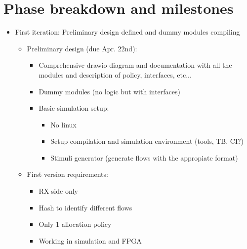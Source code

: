 \section{Phase breakdown and milestones}

\begin{itemize}
    \item First iteration: Preliminary design defined and dummy modules compiling
    \begin{itemize}
      \item Preliminary design (due Apr. 22nd):
      \begin{itemize}
        \item Comprehensive drawio diagram and documentation with all the modules and description of policy, interfaces, etc...
        \item Dummy modules (no logic but with interfaces)
        \item Basic simulation setup:
        \begin{itemize}
          \item No linux
          \item Setup compilation and simulation environment (tools, TB, CI?)
          \item Stimuli generator (generate flows with the appropiate format)
        \end{itemize}
      \end{itemize}
      \item First version requirements:
      \begin{itemize}
        \item RX side only
        \item Hash to identify different flows
        \item Only 1 allocation policy
        \item Working in simulation and FPGA
      \end{itemize}
    \end{itemize}
    
\end{itemize}
